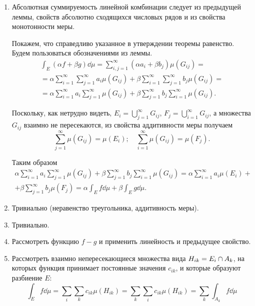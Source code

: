 \begin{proofbreak}
    \begin{enumerate}
        \item Абсолютная суммируемость линейной комбинации следует из предыдущей
            леммы, свойств абсолютно сходящихся числовых рядов и из свойства
            монотонности меры.

            Покажем, что справедливо указанное в утверждении теоремы равенство.
            Будем пользоваться обозначениями из леммы.
            \begin{multline*}
                \int_E (\alpha f + \beta g) \dd \mu = \sum_{i,j=1}^\infty (\alpha
                a_i + \beta b_j) \mu (G_{ij}) = \\ = \alpha \sum_{i=1}^\infty
                \sum_{j=1}^\infty a_i \mu (G_{ij}) + \beta \sum_{i=1}^\infty
                \sum_{j=1}^\infty b_j \mu (G_{ij}) = \\ = \alpha \sum_{i=1}^\infty
                a_i \sum_{j=1}^\infty \mu (G_{ij}) + \beta \sum_{j=1}^\infty b_j
                \sum_{i=1}^\infty \mu (G_{ij}).
            \end{multline*}

            Поскольку, как нетрудно видеть, $E_i = \bigcup\limits_{j=1}^\infty
            G_{ij}$, $F_j = \bigcup\limits_{i=1}^\infty G_{ij}$, а множества
            $G_{ij}$ взаимно не пересекаются, из свойства аддитивности меры
            получаем
            \[ \sum_{j=1}^\infty \mu (G_{ij}) = \mu(E_i); \quad
             \sum_{i=1}^\infty \mu (G_{ij}) = \mu(F_j). \]

             Таким образом
             \begin{multline*}
                \alpha \sum_{i=1}^\infty
                a_i \sum_{j=1}^\infty \mu (G_{ij}) + \beta \sum_{j=1}^\infty b_j
                \sum_{i=1}^\infty \mu (G_{ij})=   
                \alpha \sum_{i=1}^\infty
                a_i \mu(E_i) +\\+ \beta \sum_{j=1}^\infty b_j
                 \mu(F_j) = \alpha \int_E f \dd \mu + \beta \int_E g \dd \mu. 
             \end{multline*}

        \item Тривиально (неравенство треугольника, аддитивность меры).
        \item Тривиально.
        \item Рассмотреть функцию $f - g$ и применить линейность и предыдущее
            свойство.
        \item Рассмотреть взаимно непересекающиеся множества вида $\\H_{ik} = E_i \cap A_k$, 
            на которых функция принимает постоянные значения $c_{ik}$, и которые образуют
            разбиение $E$:
            \[ \int_E f \dd \mu = \sum_i \sum_k c_{ik} \mu(H_{ik}) = \sum_k
            \sum_i c_{ik} \mu(H_{ik}) = \sum_k \int_{A_k} f \dd \mu \]
    \end{enumerate}
\end{proofbreak}

